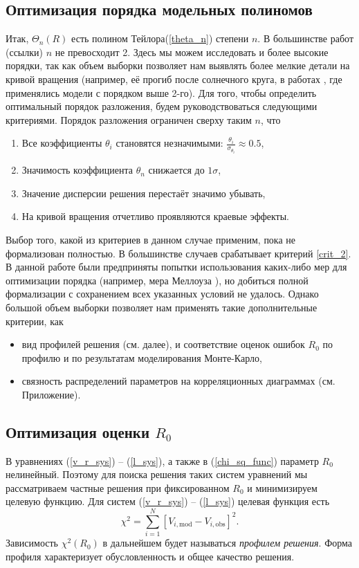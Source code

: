 \documentclass{matmex-diploma-custom}
\begin{document}
\subsection{Оптимизация порядка модельных полиномов}
Итак, $\Theta_n(R)$ есть полином Тейлора(\ref{theta_n}) степени $n$. В большинстве работ (ссылки) $n$ не превосходит 2. Здесь мы можем исследовать и более высокие порядки, так как объем выборки позволяет нам выявлять более мелкие детали на кривой вращения (например, её прогиб после солнечного круга, в работах \cite{Rastorguev} \cite{Baikbob}, где применялись модели с порядком выше 2-го). Для того, чтобы определить оптимальный порядок разложения, будем руководствоваться следующими критериями.
Порядок разложения ограничен сверху таким $n$, что
\begin{enumerate}
        \item Все коэффициенты $\theta_i$ становятся незначимыми: $\frac{\theta_i}{\sigma_{\theta_i}}\approx 0.5$, \label{crit_1}
        \item Значимость коэффициента $\theta_n$ снижается до $1 \sigma$,  \label{crit_2}
        \item Значение дисперсии решения перестаёт значимо убывать, \label{crit_3}
        \item На кривой вращения отчетливо проявляются краевые эффекты. \label{crit_4}
\end{enumerate}

Выбор того, какой из критериев в данном случае применим, пока не формализован полностью. В большинстве случаев срабатывает критерий \ref{crit_2}. В данной работе были предприняты попытки использования каких-либо мер для оптимизации порядка (например, мера Меллоуза \cite{Valeev}), но добиться полной формализации с сохранением всех указанных условий не удалось. Однако большой объем выборки позволяет нам применять такие дополнительные критерии, как 
\begin{itemize}
        \item вид профилей решения (см. далее), и соответствие оценок ошибок $R_0$ по профилю и по результатам моделирования Монте-Карло,
        \item связность распределений параметров на корреляционных диаграммах (см. Приложение).
\end{itemize}

\subsection{Оптимизация оценки $R_0$}
В уравнениях (\ref{v_r_sys}) -- (\ref{l_sys}), а также в (\ref{chi_sq_func}) параметр $R_0$ нелинейный. Поэтому для поиска решения таких систем уравнений мы рассматриваем частные решения при фиксированном $R_0$ и минимизируем целевую функцию. Для систем (\ref{v_r_sys}) -- (\ref{l_sys}) целевая функция есть
\begin{equation}
        \chi^2 = \sum_{i=1}^{N} \left [ V_{i, \mathrm{mod}} - V_{i, \mathrm{obs}} \right ]^2.
\end{equation}
Зависимость $\chi^2(R_0)$ в дальнейшем будет называться \textit{профилем решения}. Форма профиля характеризует обусловленность и общее качество решения.
\end{document}
